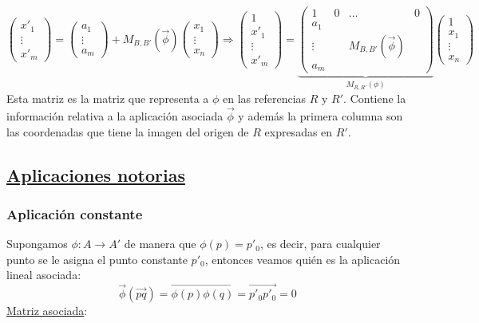 \documentclass[10pt,a4paper,openright]{book}
\begin{document}
$$ \begin{pmatrix}
x'_1 \\ \vdots \\ x'_m
\end{pmatrix} = \begin{pmatrix}
a_1 \\ \vdots \\ a_m
\end{pmatrix}+ M_{B, B'} (\vec{\phi}) \begin{pmatrix}
x_1 \\ \vdots \\ x_n
\end{pmatrix} \Rightarrow  \begin{pmatrix}
1 \\ x'_1 \\ \vdots \\ x'_m
\end{pmatrix} = \underbrace{\left(\begin{array}{c|ccc}
1  & 0 & \ldots & 0 \\
\hline
a_1  &  & & \\
\vdots &  &M_{B, B'} (\vec{\phi}) & \\
a_m & & &
\end{array}
\right)}_{M_{R, R'} (\phi)} \begin{pmatrix}
1 \\ x_1 \\ \vdots \\ x_n
\end{pmatrix} $$
Esta matriz es la matriz que representa a $\phi$ en las referencias $R$ y $R'$. Contiene la información relativa a la aplicación asociada $\vec{\phi}$ y además la primera columna son las coordenadas que tiene la imagen del origen de $R$ expresadas en $R'$.

\subsection*{\underline{Aplicaciones notorias}}
\subsubsection*{Aplicación constante}
Supongamos $\phi : A \to A'$ de manera que $\phi(p) = p'_0$, es decir, para cualquier punto se le asigna el punto constante $p'_0$, entonces veamos quién es la aplicación lineal asociada:
$$\vec{\phi}(\vec{pq}) = \overrightarrow{\phi(p)\phi(q)} = \vec{p'_0 p'_0} = 0$$
\underline{Matriz asociada}:
\end{document}
